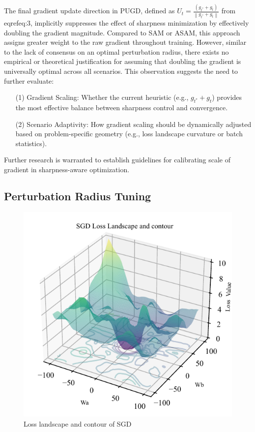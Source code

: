 \documentclass[10pt,twocolumn,letterpaper]{article}
\begin{document}
The final gradient update direction in PUGD, defined as $U_t = \frac{(g_{t^{*}} + g_t)}{\left \|g_{t^{*}} + g_t\right \| }$ from eqref{eq:3}, implicitly suppresses the effect of sharpness minimization by effectively doubling the gradient magnitude. Compared to SAM or ASAM, this approach assigns greater weight to the raw gradient throughout training. However, similar to the lack of consensus on an optimal perturbation radius, there exists no empirical or theoretical justification for assuming that doubling the gradient is universally optimal across all scenarios. This observation suggests the need to further evaluate:
\begin{enumerate}
    \item[(1)] Gradient Scaling: Whether the current heuristic (e.g., $g_{t^{*}} + g_t$) provides the most effective balance between sharpness control and convergence.
    \item[(2)] Scenario Adaptivity: How gradient scaling should be dynamically adjusted based on problem-specific geometry (e.g., loss landscape curvature or batch statistics).
\end{enumerate}
Further research is warranted to establish guidelines for calibrating scale of gradient in sharpness-aware optimization.

\subsection{Perturbation Radius Tuning}
\label{subsec:3.2}
\begin{figure}[htbp]
	\center
	\vspace{-0.5cm} 
	\includegraphics[width=\columnwidth]{images/SGD_LLC.pdf}
	\caption{Loss landscape and contour of SGD}
	\label{fig:SGD_LLC}
\end{figure}
\end{document}
